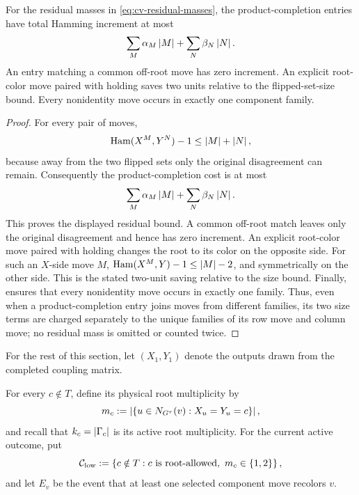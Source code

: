 \begin{lemma}
\label{lem:cv-completion-cost}
For the residual masses in \eqref{eq:cv-residual-masses}, the
product-completion entries have total Hamming increment at most
\[
  \sum_M\alpha_M\left|M\right|+\sum_N\beta_N\left|N\right|.
\]
An entry matching a common off-root move has zero increment.  An explicit
root-color move paired with holding saves two units relative to the
flipped-set-size bound.
Every nonidentity move occurs in exactly one component family.
\end{lemma}

\begin{proof}
For every pair of moves,
\[
  \operatorname{Ham}(X^M,Y^N)-1\le\left|M\right|+\left|N\right|,
\]
because away from the two flipped sets only the original disagreement can
remain.  Consequently the product-completion cost is at most
\[
  \sum_M\alpha_M\left|M\right|+\sum_N\beta_N\left|N\right|.
\]
This proves the displayed residual bound.  A common off-root match leaves
only the original disagreement and hence has zero increment.  An explicit
root-color move paired with holding changes the root to its color on the
opposite side.  For such an $X$-side move $M$,
\(\operatorname{Ham}(X^M,Y)-1\le |M|-2\), and symmetrically on the other side.
This is the stated two-unit saving relative to the size bound.  Finally,
 ensures that every nonidentity move occurs in
exactly one family.  Thus, even when a product-completion entry joins moves
from different families, its two size terms are charged separately to the
unique families of its row move and column move; no residual mass is omitted
or counted twice.
\end{proof}

For the rest of this section, let \((X_1,Y_1)\) denote the outputs drawn
from the completed coupling matrix.

For every \(c\notin T\), define its physical root multiplicity by
\[
 m_c:=\left|\left\{u\in N_{G^\tau}(v):X_u=Y_u=c\right\}\right|,
\]
and recall that \(k_c=\left|\Gamma_c\right|\) is its active root multiplicity.
For the current active outcome, put
\[
 \mathcal C_{\rm low}:=
    \left\{c\notin T:c\text{ is root-allowed},\
                      m_c\in\left\{1,2\right\}\right\},
\]
and let \(E_v\) be the event that at least one selected component move
recolors \(v\).

